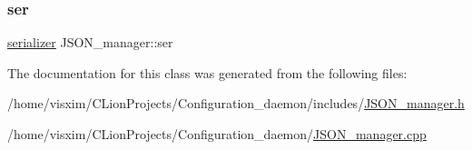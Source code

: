 \mbox{\label{classJSON__manager_a0997283f905b0f2b4a58ad1ee6d678ed}} 
\subsubsection{\texorpdfstring{ser}{ser}}
{\footnotesize\ttfamily \hyperlink{classserializer}{serializer} J\+S\+O\+N\+\_\+manager\+::ser\hspace{0.3cm}{\ttfamily [private]}}



The documentation for this class was generated from the following files\+:\begin{DoxyCompactItemize}
\item 
/home/visxim/\+C\+Lion\+Projects/\+Configuration\+\_\+daemon/includes/\hyperlink{JSON__manager_8h}{J\+S\+O\+N\+\_\+manager.\+h}\item 
/home/visxim/\+C\+Lion\+Projects/\+Configuration\+\_\+daemon/\hyperlink{JSON__manager_8cpp}{J\+S\+O\+N\+\_\+manager.\+cpp}\end{DoxyCompactItemize}
